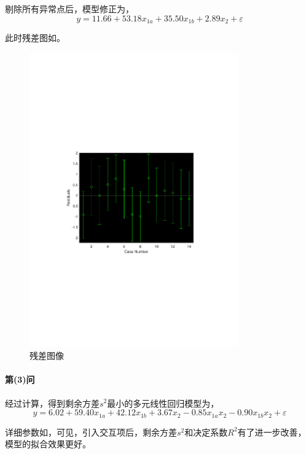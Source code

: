 剔除所有异常点后，模型修正为，
\begin{equation}
    y = 11.66 + 53.18 x_{1a} + 35.50 x_{1b} + 2.89 x_2 + \varepsilon
\end{equation}

此时残差图如。

\begin{figure}[H]
    \centering
    \includegraphics[width=0.8\textwidth,trim={3.09cm 9.295cm 3.09cm 9.295cm},clip]{fig/ex9_x1ab_rcoplot_no_outlier.pdf}
    \caption{残差图像}
    \label{fig:ex9_x1ab_rcoplot_no_outlier}
\end{figure}

\paragraph{第(3)问} 经过计算，得到剩余方差$s^2$最小的多元线性回归模型为，
\begin{equation}\label{eq:ex9_interact}
    y = 6.02 + 59.40 x_{1a} + 42.12 x_{1b} + 3.67 x_2 -0.85 x_{1a} x_2 -0.90 x_{1b} x_2 + \varepsilon
\end{equation}

详细参数如，可见，引入交互项后，剩余方差$s^2$和决定系数$R^2$有了进一步改善，模型的拟合效果更好。

